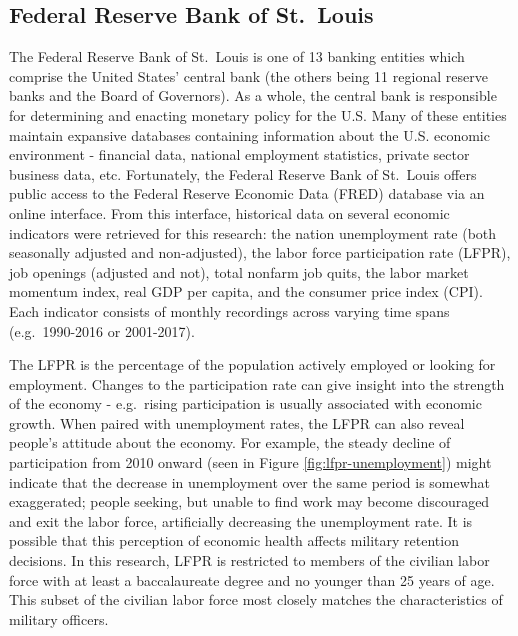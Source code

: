 \documentclass[12pt,letterpaper,toc=flat,oneside]{report}
\theoremstyle{definition}
\theoremstyle{definition}
\theoremstyle{definition}
\theoremstyle{remark}
\begin{document}
\hypertarget{federal-reserve-bank-of-st.louis}{%
\subsection{Federal Reserve Bank of
St.~Louis}\label{federal-reserve-bank-of-st.louis}}

The Federal Reserve Bank of St.~Louis is one of 13 banking entities
which comprise the United States' central bank (the others being 11
regional reserve banks and the Board of Governors). As a whole, the
central bank is responsible for determining and enacting monetary policy
for the U.S. Many of these entities maintain expansive databases
containing information about the U.S. economic environment - financial
data, national employment statistics, private sector business data, etc.
Fortunately, the Federal Reserve Bank of St.~Louis offers public access
to the Federal Reserve Economic Data (FRED) database via an online
interface. From this interface, historical data on several economic
indicators were retrieved for this research: the nation unemployment
rate (both seasonally adjusted and non-adjusted), the labor force
participation rate (LFPR), job openings (adjusted and not), total
nonfarm job quits, the labor market momentum index, real GDP per capita,
and the consumer price index (CPI). Each indicator consists of monthly
recordings across varying time spans (e.g.~1990-2016 or 2001-2017).

The LFPR is the percentage of the population actively employed or
looking for employment. Changes to the participation rate can give
insight into the strength of the economy - e.g.~rising participation is
usually associated with economic growth. When paired with unemployment
rates, the LFPR can also reveal people's attitude about the economy. For
example, the steady decline of participation from 2010 onward (seen in
Figure \ref{fig:lfpr-unemployment}) might indicate that the decrease in
unemployment over the same period is somewhat exaggerated; people
seeking, but unable to find work may become discouraged and exit the
labor force, artificially decreasing the unemployment rate. It is
possible that this perception of economic health affects military
retention decisions. In this research, LFPR is restricted to members of
the civilian labor force with at least a baccalaureate degree and no
younger than 25 years of age. This subset of the civilian labor force
most closely matches the characteristics of military officers.
\end{document}
